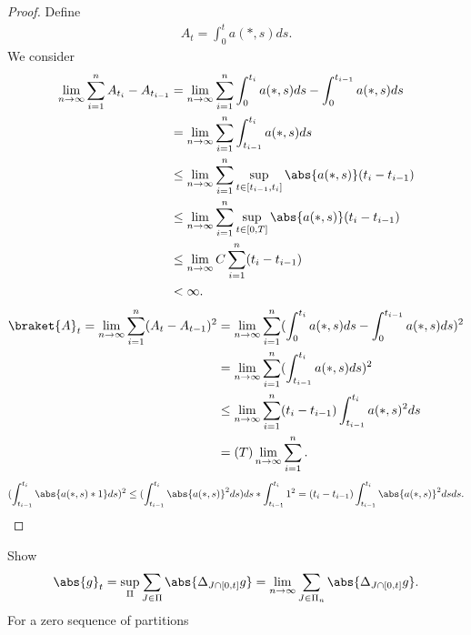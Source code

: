 \begin{proof}
 Define  
\begin{align*}
  A_t = \int_0^{t} a(*,s) ds 
.\end{align*}
We consider 
\begin{align*}
  \lim_{n \to \infty} \sum_{i=1}^{n} A_{t_i} - A_{t_{i-1}} &=  \lim_{n \to \infty} \sum_{i=1}^{n} \int_0^{t_i} a(*,s) ds - \int_0^{t_{i-1}} a(*,s) ds  \\
                                                           &=  \lim_{n \to \infty} \sum_{i=1}^{n} \int_{t_{i-1}}^{t_i}  a(*,s) ds\\
                                                           &\le   \lim_{n \to \infty} \sum_{i=1}^{n} \sup_{t \in [t_{i-1},t_i]} \abs{a(*,s)}(t_{i}-t_{i-1}) \\
                                                           &\le   \lim_{n \to \infty} \sum_{i=1}^{n} \sup_{t \in [0,T]} \abs{a(*,s)}(t_{i}-t_{i-1}) \\
                                                           &\le   \lim_{n \to \infty} C \sum_{i=1}^{n} (t_{i}-t_{i-1}) \\
                                                           &< \infty
.\end{align*}
\begin{align*}
  \braket{A}_t = \lim_{n\to \infty} \sum_{i=1}^{n} (A_{t}-A_{t-1})^2  &= \lim_{n \to \infty} \sum_{i=1}^{n} (\int_0^{t_i} a(*,s) ds - \int_0^{t_{i-1}} a(*,s) ds)^2  \\
                                                                      &= \lim_{n \to \infty} \sum_{i=1}^{n} (\int_{t_{i-1}}^{t_i} a(*,s) ds)^2  \\
                                                                      &\le  \lim_{n \to \infty} \sum_{i=1}^{n} (t_i-t_{i-1})\int_{t_{i-1}}^{t_i} a(*,s)^2 ds  \\
                                                                      &=    (T) \lim_{n\to \infty} \sum_{i=1}^{n}
.\end{align*}
\begin{align*}
  (\int_{t_{i-1}}^{t_i} \abs{a(*,s)*1} ds)^2 \le (\int_{t_{i-1}}^{t_i} \abs{a(*,s)}^2 ds) ds *\int_{t_{i-1}}^{t_i}  1^2 = (t_{i}-t_{i-1})\int_{t_{i-1}}^{t_i} \abs{a(*,s)}^2 ds ds
.\end{align*}
\end{proof}
\begin{lemma}
Show 
\begin{align*}
  \abs{g}_t  = \sup_{\Pi } \sum_{J \in  \Pi }\abs{\Delta_{J \cap [0,t]} g} = \lim_{n\to \infty} \sum_{J \in  \Pi_n} \abs{\Delta_{J \cap [0,t]} g}
.\end{align*}
For a zero sequence of partitions 
\end{lemma}
